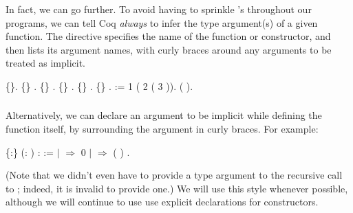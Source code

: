 \documentclass[12pt]{report}
\begin{document}
 In fact, we can go further.  To avoid having to sprinkle \coqdocvar{\_}'s
    throughout our programs, we can tell Coq \textit{always} to infer the
    type argument(s) of a given function. The  directive
    specifies the name of the function or constructor, and then lists
    its argument names, with curly braces around any arguments to be
    treated as implicit. 
    \begin{coqdoccode}
\coqdocemptyline
\coqdocnoindent
{}  \{\}.\coqdoceol
\coqdocnoindent
{}  \{\} \coqdocvar{\_} \coqdocvar{\_}. \coqdocnoindent
{}  \{\} .\coqdoceol
\coqdocnoindent
{}  \{\}  .\coqdoceol
\coqdocnoindent
{}  \{\} .\coqdoceol
\coqdocnoindent
{}  \{\}  .\coqdoceol
\coqdocemptyline
\coqdocnoindent
{}  :=  1 ( 2 ( 3 )).\coqdoceol
\coqdocnoindent
{} ( ).\coqdoceol
\coqdocemptyline
\end{coqdoccode}
\subsubsection{ }



 Alternatively, we can declare an argument to be implicit while
    defining the function itself, by surrounding the argument in curly
    braces.  For example: \begin{coqdoccode}
\coqdocemptyline
\coqdocnoindent
{}  \{:\} (: ) :  :=\coqdoceol
\coqdocindent{1.00em}
  \coqdoceol
\coqdocindent{1.00em}
\ensuremath{|}       \ensuremath{\Rightarrow} 0\coqdoceol
\coqdocindent{1.00em}
\ensuremath{|}    \ensuremath{\Rightarrow}  ( )\coqdoceol
\coqdocindent{1.00em}
.\coqdoceol
\coqdocemptyline
\end{coqdoccode}
(Note that we didn't even have to provide a type argument to
    the recursive call to ; indeed, it is invalid to provide
    one.)  We will use this style whenever possible, although we will
    continue to use use explicit  declarations for
     constructors. 
\end{document}
